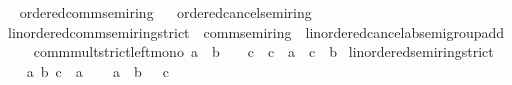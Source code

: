 \begin{isabellebody}
\isadelimproof
\ %
\endisadelimproof
%
\isatagproof
\isacommand{{\isachardot}{\kern0pt}{\isachardot}{\kern0pt}}\isamarkupfalse%
%
\endisatagproof
{\isafoldproof}%
%
\isadelimproof
%
\endisadelimproof
\isanewline
{}\isamarkupfalse%
\ ordered{\isacharunderscore}{\kern0pt}comm{\isacharunderscore}{\kern0pt}semiring%
\isadelimproof
\ %
\endisadelimproof
%
\isatagproof
\isacommand{{\isachardot}{\kern0pt}{\isachardot}{\kern0pt}}\isamarkupfalse%
%
\endisatagproof
{\isafoldproof}%
%
\isadelimproof
%
\endisadelimproof
\isanewline
{}\isamarkupfalse%
\ ordered{\isacharunderscore}{\kern0pt}cancel{\isacharunderscore}{\kern0pt}semiring%
\isadelimproof
\ %
\endisadelimproof
%
\isatagproof
\isacommand{{\isachardot}{\kern0pt}{\isachardot}{\kern0pt}}\isamarkupfalse%
%
\endisatagproof
{\isafoldproof}%
%
\isadelimproof
%
\endisadelimproof
\isanewline
\isanewline
{}\isamarkupfalse%
\isanewline
\isanewline
{}\isamarkupfalse%
\ linordered{\isacharunderscore}{\kern0pt}comm{\isacharunderscore}{\kern0pt}semiring{\isacharunderscore}{\kern0pt}strict\ {\isacharequal}{\kern0pt}\ comm{\isacharunderscore}{\kern0pt}semiring{\isacharunderscore}{\kern0pt}{}\ {\isacharplus}{\kern0pt}\ linordered{\isacharunderscore}{\kern0pt}cancel{\isacharunderscore}{\kern0pt}ab{\isacharunderscore}{\kern0pt}semigroup{\isacharunderscore}{\kern0pt}add\ {\isacharplus}{\kern0pt}\isanewline
\ \ \ comm{\isacharunderscore}{\kern0pt}mult{\isacharunderscore}{\kern0pt}strict{\isacharunderscore}{\kern0pt}left{\isacharunderscore}{\kern0pt}mono{\isacharcolon}{\kern0pt}\ {\isachardoublequoteopen}a\ {\isacharless}{\kern0pt}\ b\ {\isasymLongrightarrow}\ {}\ {\isacharless}{\kern0pt}\ c\ {\isasymLongrightarrow}\ c\ {\isacharasterisk}{\kern0pt}\ a\ {\isacharless}{\kern0pt}\ c\ {\isacharasterisk}{\kern0pt}\ b{\isachardoublequoteclose}\isanewline
{}\isanewline
\isanewline
{}\isamarkupfalse%
\ linordered{\isacharunderscore}{\kern0pt}semiring{\isacharunderscore}{\kern0pt}strict\isanewline
%
\isadelimproof
%
\endisadelimproof
%
\isatagproof
{}\isamarkupfalse%
\isanewline
\ \ \isamarkupfalse%
\ a\ b\ c\ {\isacharcolon}{\kern0pt}{\isacharcolon}{\kern0pt}\ {\isacharprime}{\kern0pt}a\isanewline
\ \ \isamarkupfalse%
\ {\isachardoublequoteopen}a\ {\isacharless}{\kern0pt}\ b{\isachardoublequoteclose}\ {\isachardoublequoteopen}{}\ {\isacharless}{\kern0pt}\ c{\isachardoublequoteclose}\isanewline
\ \ \isamarkupfalse%

\end{isabellebody}
